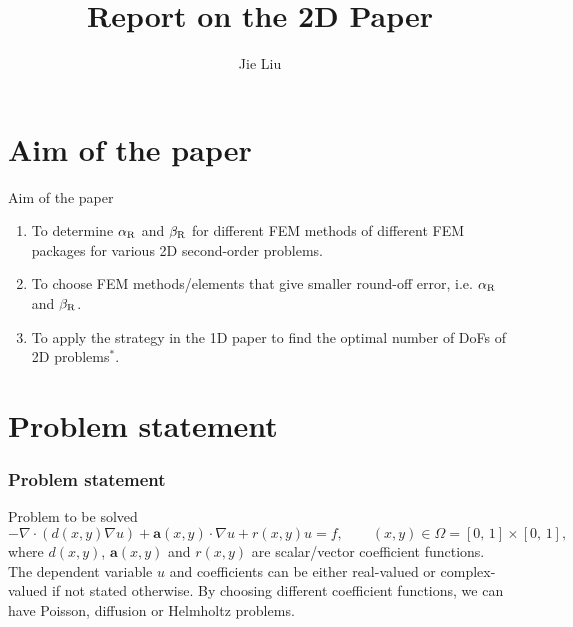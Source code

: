 \documentclass{beamer}
\title[]{Report on the 2D Paper}
\institute[]{Delft University of Technology, the Netherlands}
\author{Jie Liu}
\begin{document}
{
\frame{\titlepage}
}


\section{Aim of the paper}
\begin{frame}{Aim of the paper}
\vspace{-8em}
\begin{enumerate}
 \item To determine $\alpha_{\rm R}$ and $\beta_{\rm R}$ for different FEM methods of different FEM packages for various 2D second-order problems.
 \item To choose FEM methods/elements that give smaller round-off error, i.e. $\alpha_{\rm R}$ and $\beta_{\rm R}$.
 \item To apply the strategy in the 1D paper to find the optimal number of DoFs of 2D problems$^{*}$.
\end{enumerate}
\end{frame}

\section{Problem statement}
\begin{frame}
\frametitle{Problem statement}
\vspace{-7em}
\begin{block}{Problem to be solved}
\scriptsize
\begin{equation}
 - \nabla \cdot (d(x,y) \nabla u) + \mathbf{a}(x,y) \cdot \nabla u + r(x,y) u = f,\qquad (x,y) \in \Omega = [0,\,1] \times [0,\,1],
 \label{problem_to_be_investigated}
\end{equation}
where $d(x,y)$, $\mathbf{a}(x,y)$ and $r(x,y)$ are scalar/vector coefficient functions. The dependent variable $u$ and coefficients can be either real-valued or complex-valued if not stated otherwise. By choosing different coefficient functions, we can have Poisson, diffusion or Helmholtz problems.
\end{block}
\end{frame}
\end{document}
